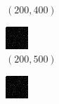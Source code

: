 \documentclass[a4paper, landscape]{article}
\begin{document}
\begin{figure}[H]
\begin{subfigure}{0.09\linewidth}
        \caption*{$(200, 400)$}
    \end{subfigure}
    \begin{subfigure}{0.09\linewidth}
        \centering
        \includegraphics[width=\linewidth]{omp/k = 200, m = 500.png}
        \caption*{$(200, 500)$}
    \end{subfigure}
    \begin{subfigure}{0.09\linewidth}
        \centering
        \includegraphics[width=\linewidth]{omp/k = 200, m = 600.png}

\end{subfigure}
\end{figure}
\end{document}
